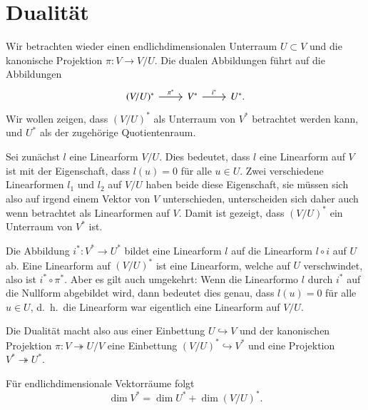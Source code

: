 %
%
%
\section{Dualität}
Wir betrachten wieder einen endlichdimensionalen Unterraum $U\subset V$
und die kanonische Projektion $\pi\colon V\to V/U$.
Die dualen Abbildungen führt auf die Abbildungen
\[
\begin{tikzcd}
(V/U)^* \ar[r,"\pi^*"] & V^* \ar[r, "i^*"] & U^*.
\end{tikzcd}
\]
Wir wollen zeigen, dass $(V/U)^*$ als Unterraum von $V^*$
betrachtet werden kann, und $U^*$ als der zugehörige Quotientenraum.

Sei zunächst $l$ eine Linearform $V/U$.
Dies bedeutet, dass $l$ eine Linearform auf $V$ ist mit der Eigenschaft,
dass $l(u)=0$ für alle $u\in U$.
Zwei verschiedene Linearformen $l_1$ und $l_2$ auf $V/U$ haben 
beide diese Eigenschaft, sie müssen sich also auf irgend einem
Vektor von $V$ unterschieden, unterscheiden sich daher auch wenn
betrachtet als Linearformen auf $V$.
Damit ist gezeigt, dass $(V/U)^*$ ein Unterraum von $V^*$ ist.

Die Abbildung $i^*\colon V^* \to U^*$ bildet eine Linearform $l$
auf die Linearform $l\circ i$ auf $U$ ab.
Eine Linearform auf $(V/U)^*$ ist eine Linearform, welche auf $U$
verschwindet, also ist $i^*\circ \pi^*$.
Aber es gilt auch umgekehrt: Wenn die Linearformo $l$ durch $i^*$ auf
die Nullform abgebildet wird, dann bedeutet dies genau, dass $l(u)=0$
für alle $u\in U$, d.~h.~die Linearform war eigentlich eine Linearform
auf $V/U$.

Die Dualität macht also aus einer Einbettung $U\hookrightarrow V$ und der
kanonischen Projektion $\pi\colon V\twoheadrightarrow U/V$ eine Einbettung
$(V/U)^* \hookrightarrow V^*$ und eine Projektion $V^* \twoheadrightarrow U^*$.

Für endlichdimensionale Vektorräume folgt
\[
\dim V^* = \dim U^* + \dim (V/U)^*.
\]

